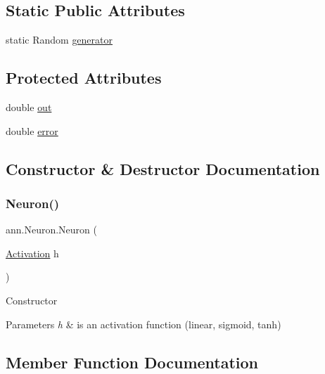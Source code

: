 \subsection*{Static Public Attributes}
\begin{DoxyCompactItemize}
\item 
static Random \hyperlink{classann_1_1_neuron_ac7d2bce61156cee5b79e960bf719ee6b}{generator}
\end{DoxyCompactItemize}
\subsection*{Protected Attributes}
\begin{DoxyCompactItemize}
\item 
double \hyperlink{classann_1_1_neuron_a50568ffff3bd8194ded913041414b244}{out}
\item 
double \hyperlink{classann_1_1_neuron_a68c3c65ea538d533aae8a343b043d921}{error}
\end{DoxyCompactItemize}


\subsection{Constructor \& Destructor Documentation}
\mbox{\label{classann_1_1_neuron_ab0f583ed1a1c83ed5ff5bc24c77db902}} 
\subsubsection{\texorpdfstring{Neuron()}{Neuron()}}
{\footnotesize\ttfamily ann.\+Neuron.\+Neuron (\begin{DoxyParamCaption}\item[{\hyperlink{interfaceann_1_1_activation}{Activation}}]{h }\end{DoxyParamCaption})}

Constructor 
\begin{DoxyParams}{Parameters}
{\em h} & is an activation function (linear, sigmoid, tanh) \\
\hline
\end{DoxyParams}


\subsection{Member Function Documentation}
\mbox{\label{classann_1_1_neuron_acb5bda80a06130b2c68bba370ee27a84}} 
